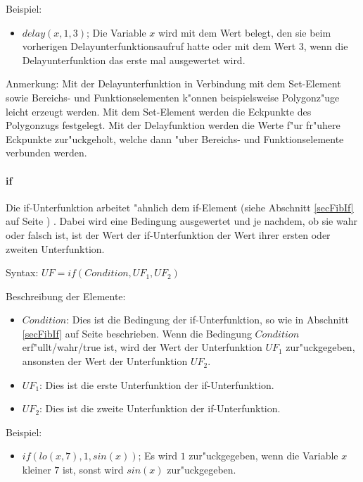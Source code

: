 \bigskip\noindent
Beispiel:
\begin{itemize}
 \item $delay(x, 1, 3)$; Die Variable $x$ wird mit dem Wert belegt, den sie beim vorherigen Delayunterfunktionsaufruf hatte oder mit dem Wert $3$, wenn die Delayunterfunktion das erste mal ausgewertet wird.
\end{itemize}

\bigskip\noindent
Anmerkung:
Mit der Delayunterfunktion in Verbindung mit dem Set-Element sowie Bereichs- und Funktionselementen k"onnen beispielsweise Polygonz"uge leicht erzeugt werden. Mit dem Set-Element werden die Eckpunkte des Polygonzugs festgelegt. Mit der Delayfunktion werden die Werte f"ur fr"uhere Eckpunkte zur"uckgeholt, welche dann "uber Bereichs- und Funktionselemente verbunden werden.


\paragraph{if}

Die if-Unterfunktion arbeitet "ahnlich dem if-Element (siehe Abschnitt \ref{secFibIf} auf Seite \pageref{secFibIf}) . Dabei wird eine Bedingung ausgewertet und je nachdem, ob sie wahr oder falsch ist, ist der Wert der if-Unterfunktion der Wert ihrer ersten oder zweiten Unterfunktion.

\bigskip\noindent
Syntax:
$UF=if( Condition, UF_1, UF_2 )$


\bigskip\noindent
Beschreibung der Elemente:
\begin{itemize}
 \item $Condition$: Dies ist die Bedingung der if-Unterfunktion, so wie in Abschnitt \ref{secFibIf} auf Seite \pageref{secFibIf} beschrieben. Wenn die Bedingung $Condition$ erf"ullt/wahr/true ist, wird der Wert der Unterfunktion $UF_1$ zur"uckgegeben, ansonsten der Wert der Unterfunktion $UF_2$.
 \item $UF_1$: Dies ist die erste Unterfunktion der if-Unterfunktion.
 \item $UF_2$: Dies ist die zweite Unterfunktion der if-Unterfunktion.
\end{itemize}

\bigskip\noindent
Beispiel:
\begin{itemize}
 \item $if( lo(x, 7), 1, sin(x) )$; Es wird $1$ zur"uckgegeben, wenn die Variable $x$ kleiner $7$ ist, sonst wird $sin(x)$ zur"uckgegeben.
\end{itemize}


